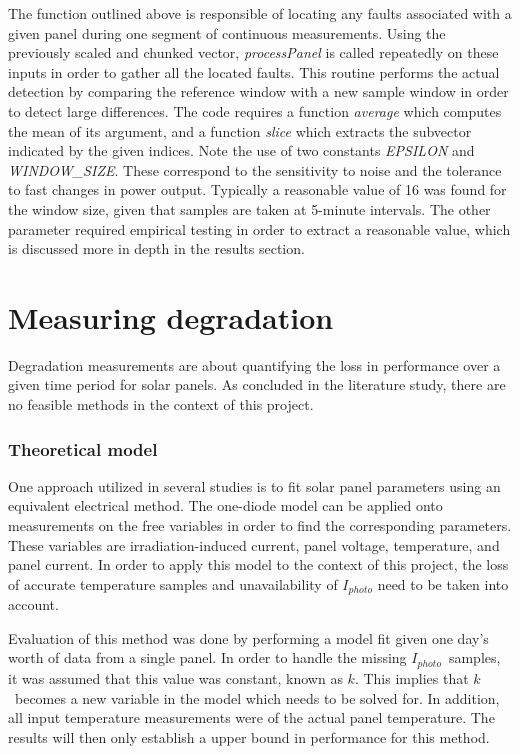 The function outlined above is responsible of locating any faults associated with a given panel during one segment of continuous measurements.
Using the previously scaled and chunked vector, \emph{processPanel} is called repeatedly on these inputs in order to gather all the located faults.
This routine performs the actual detection by comparing the reference window with a new sample window in order to detect large differences.
The code requires a function \emph{average} which computes the mean of its argument, and a function \emph{slice} which extracts the subvector indicated by the given indices.
Note the use of two constants \emph{EPSILON} and \emph{WINDOW\_SIZE}.
These correspond to the sensitivity to noise and the tolerance to fast changes in power output.
Typically a reasonable value of 16 was found for the window size, given that samples are taken at 5-minute intervals.
The other parameter required empirical testing in order to extract a reasonable value, which is discussed more in depth in the results section.

\section{Measuring degradation}
Degradation measurements are about quantifying the loss in performance over a given time period for solar panels.
As concluded in the literature study, there are no feasible methods in the context of this project.

\subsubsection{Theoretical model}
One approach utilized in several studies is to fit solar panel parameters using an equivalent electrical method.
The one-diode model can be applied onto measurements on the free variables in order to find the corresponding parameters.
These variables are irradiation-induced current, panel voltage, temperature, and panel current.
In order to apply this model to the context of this project, the loss of accurate temperature samples and unavailability of
$I_{photo}$ need to be taken into account.

Evaluation of this method was done by performing a model fit given one day's worth of data from a single panel.
In order to handle the missing $I_{photo}$ samples, it was assumed that this value was constant, known as $k$.
This implies that $k$ becomes a new variable in the model which needs to be solved for.
In addition, all input temperature measurements were of the actual panel temperature.
The results will then only establish a upper bound in performance for this method.


